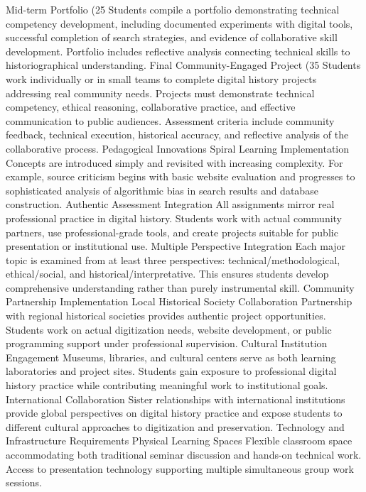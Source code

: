 Mid-term Portfolio (25%
Students compile a portfolio demonstrating technical competency development, including documented experiments with digital tools, successful completion of search strategies, and evidence of collaborative skill development. Portfolio includes reflective analysis connecting technical skills to historiographical understanding.
Final Community-Engaged Project (35%
Students work individually or in small teams to complete digital history projects addressing real community needs. Projects must demonstrate technical competency, ethical reasoning, collaborative practice, and effective communication to public audiences. Assessment criteria include community feedback, technical execution, historical accuracy, and reflective analysis of the collaborative process.
Pedagogical Innovations
Spiral Learning Implementation
Concepts are introduced simply and revisited with increasing complexity. For example, source criticism begins with basic website evaluation and progresses to sophisticated analysis of algorithmic bias in search results and database construction.
Authentic Assessment Integration
All assignments mirror real professional practice in digital history. Students work with actual community partners, use professional-grade tools, and create projects suitable for public presentation or institutional use.
Multiple Perspective Integration
Each major topic is examined from at least three perspectives: technical/methodological, ethical/social, and historical/interpretative. This ensures students develop comprehensive understanding rather than purely instrumental skill.
Community Partnership Implementation
Local Historical Society Collaboration
Partnership with regional historical societies provides authentic project opportunities. Students work on actual digitization needs, website development, or public programming support under professional supervision.
Cultural Institution Engagement
Museums, libraries, and cultural centers serve as both learning laboratories and project sites. Students gain exposure to professional digital history practice while contributing meaningful work to institutional goals.
International Collaboration
Sister relationships with international institutions provide global perspectives on digital history practice and expose students to different cultural approaches to digitization and preservation.
Technology and Infrastructure Requirements
Physical Learning Spaces
Flexible classroom space accommodating both traditional seminar discussion and hands-on technical work. Access to presentation technology supporting multiple simultaneous group work sessions.
